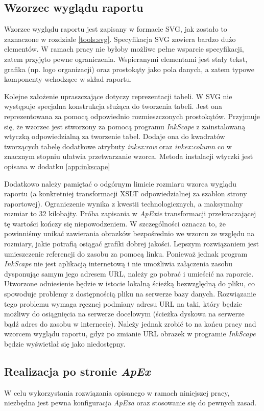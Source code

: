 \documentclass[11pt,a4paper]{article}
\begin{document}
\subsection{Wzorzec wyglądu raportu} \label{solution:layout}
Wzorzec wyglądu raportu jest zapisany w formacie SVG, jak zostało to zaznaczone w rozdziale \ref{tools:svg}. Specyfikacja SVG zawiera bardzo dużo elementów. W ramach pracy nie byłoby możliwe pełne wsparcie specyfikacji, zatem przyjęto pewne ograniczenia. Wspieranymi elementami jest stały tekst, grafika (np. logo organizacji) oraz prostokąty jako pola danych, a zatem typowe komponenty wchodzące w skład raportu.

Kolejne założenie upraszczające dotyczy reprezentacji tabeli. W SVG nie występuje specjalna konstrukcja służąca do tworzenia tabeli. Jest ona reprezentowana za pomocą odpowiednio rozmieszczonych prostokątów. Przyjmuje się, że wzorzec jest stworzony za pomocą programu \emph{InkScape} z zainstalowaną wtyczką odpowiedzialną za tworzenie tabel. Dodaje ona do kwadratów tworzących tabelę dodatkowe atrybuty \emph{inkex:row} oraz \emph{inkex:column} co w znacznym stopniu ułatwia przetwarzanie wzorca. Metoda instalacji wtyczki jest opisana w dodatku \ref{app:inkscape} 

Dodatkowo należy pamiętać o odgórnym limicie rozmiaru wzorca wyglądu raportu (a konkretniej transformacji XSLT odpowiedzialnej za szablon strony raportowej). Ograniczenie wynika z kwestii technologicznych, a maksymalny rozmiar to 32 kilobajty. Próba zapisania w \emph{ApExie} transformacji przekraczającej tę wartości kończy się niepowodzeniem. W szczególności oznacza to, że powinniśmy unikać zawierania obrazków bezpośrednio we wzorcu ze względu na rozmiary, jakie potrafią osiągać grafiki dobrej jakości. Lepszym rozwiązaniem jest umieszczenie referencji do zasobu za pomocą linku. Ponieważ jednak program \emph{InkScape} nie jest aplikacją internetową i nie umożliwia załączenia zasobu dysponując samym jego adresem URL, należy go pobrać i umieścić na raporcie. Utworzone odniesienie będzie w istocie lokalną ścieżką bezwzględną do pliku, co spowoduje problemy z dostępnością pliku na serwerze bazy danych. Rozwiązanie tego problemu wymaga ręcznej podmiany adresu URL na taki, który będzie możliwy do osiągnięcia na serwerze docelowym (ścieżka dyskowa na serwerze bądź adres do zasobu w internecie). Należy jednak zrobić to na końcu pracy nad wzorcem wyglądu raportu, gdyż po zmianie URL obrazek w programie \emph{InkScape} będzie wyświetlał się jako niedostępny.


\subsection{Realizacja po stronie \emph{ApEx}} \label{solution:realization}
W celu wykorzystania rozwiązania opisanego w ramach niniejszej pracy, niezbędna jest pewna konfiguracja \emph{ApExa} oraz stosowanie się do pewnych zasad.
\end{document}
